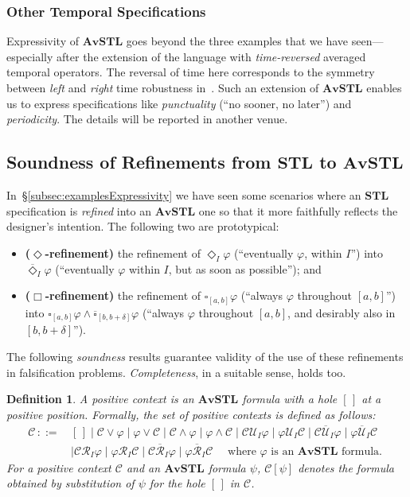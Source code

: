 \documentclass[envcountsect,orivec]{llncs} \usepackage{etex} \usepackage[]{graphicx}
\newtheorem{mydefinition}[mytheorem]{Definition}
\newcommand{\STL}{\textbf{STL}}
\newcommand{\UntilOp}[1]{\mathbin{\mathcal{U}_{#1}}}
\newcommand{\Release}[1]{\mathbin{\mathcal{R}_{#1}}}
\newcommand{\TUntil}[1]{\mathbin{\overline{\mathcal{U}}_{#1}}}
\newcommand{\TRelease}[1]{\mathbin{\overline{\mathcal{R}}_{#1}}}
\newcommand{\DiaOp}[1]{\Diamond_{#1}}
\newcommand{\BoxOp}[1]{\square_{#1}}
\newcommand{\TDiaOp}[1]{\overline{\Diamond}_{#1}}
\newcommand{\TBoxOp}[1]{\overline{\square}_{#1}}
\newcommand{\AvSTL}{\textbf{AvSTL}}
\newcommand{\C}{\mathcal{C}}
\begin{document}
\subsubsection{Other Temporal Specifications}
Expressivity of $\AvSTL$ goes beyond the three examples that we have
seen---especially after the extension of the language with
\emph{time-reversed} averaged temporal operators. The reversal of time
here corresponds to the symmetry between \emph{left} and \emph{right}
time robustness in~\cite{DBLP:conf/formats/DonzeM10}.  Such an
extension of $\AvSTL$ enables us to express specifications like
\emph{punctuality}
 (``no sooner, no later'') and \emph{periodicity}. The details will be
 reported in another venue.


\subsection{Soundness of  Refinements from $\STL$ to $\AvSTL$}\label{subsec:soundnessOfEnrichments}
In~\S\ref{subsec:examplesExpressivity} we have seen some scenarios where
an $\STL$ specification is \emph{refined} into an $\AvSTL$ one so that
it more faithfully reflects the designer's intention. The following two
are prototypical:
\begin{itemize}
 \item{}
  \textbf{($\Diamond$-refinement)}
  the refinement
 of $\DiaOp{I}\varphi$ (``eventually $\varphi$, within $I$'') into
 $\TDiaOp{I}\varphi$
 (``eventually $\varphi$ within $I$, but as soon as possible''); and
 \item{}
  \textbf{($\Box$-refinement)}
 the refinement of
 $\BoxOp{[a,b]}\varphi$ 
 (``always $\varphi$ throughout $[a,b]$'') into
 $\BoxOp{[a,b]}\varphi\land\TBoxOp{[b,b+\delta]}\varphi$ (``always
 $\varphi$ throughout $[a,b]$, and desirably also in $[b,b+\delta]$'').
\end{itemize} 
The following \emph{soundness} 
results
guarantee validity of the use of these refinements in falsification
problems. \emph{Completeness}, in a suitable sense, holds too.

\begin{mydefinition}
  \label{def:context}
  A \emph{positive context} is
  an $\AvSTL$ formula with a hole $[\,]$ at a positive position.
  Formally, 
  the set of positive contexts is defined as follows:
  \[
  \begin{array}{rl}
    \C \,::=\,& [\,] \mid \C \vee \varphi \mid \varphi \vee \C 
                \mid \C \wedge \varphi \mid \varphi \wedge \C
                \mid \C \UntilOp{I} \varphi 
                \mid \varphi \UntilOp{I} \C 
                \mid \C \TUntil{I} \varphi 
                \mid \varphi \TUntil{I} \C\\
              & \mid \C \Release{I} \varphi 
                \mid \varphi \Release{I} \C 
                \mid \C \TRelease{I} \varphi
                \mid \varphi \TRelease{I} \C \quad
                \text{ where $\varphi$ is an $\AvSTL$ formula. }
  \end{array}
  \]
  For a positive context $\C$ and an $\AvSTL$ formula $\psi$,
  $\C[\psi]$ denotes the formula 
  obtained by substitution of $\psi$
  for the hole $[\,]$ in $\C$.
\end{mydefinition}
\end{document}
